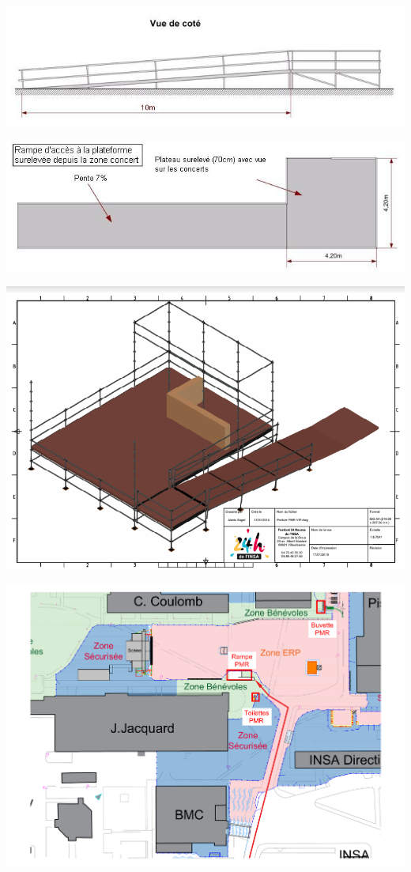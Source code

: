 \documentclass[hidelinks, paper=a4, fontsize=13pt]{report}
\begin{document}
\begin{center}
\includegraphics[scale=0.8]{Annexes/Images/structurePMRCote}
\end{center}
\begin{center}
\includegraphics[scale=0.8]{Annexes/Images/structurePMRDessus}
\end{center}
\begin{center}
\includegraphics[scale=0.6]{Annexes/Images/structurePMR3D}
\end{center}
\begin{center}
\includegraphics[width=.8\textwidth,keepaspectratio]{Exports/Plan_24h_45eme-Acces_PMR_Rampe}
\end{center}
\end{document}
